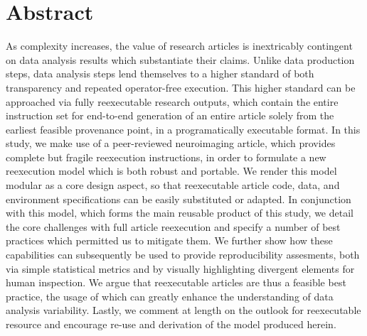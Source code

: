 \section{Abstract}

As complexity increases, the value of research articles is inextricably contingent on data analysis results which substantiate their claims.
Unlike data production steps, data analysis steps lend themselves to a higher standard of both transparency and repeated operator-free execution.
This higher standard can be approached via fully reexecutable research outputs, which contain the entire instruction set for end-to-end generation of an entire article solely from the earliest feasible provenance point, in a programatically executable format.
In this study, we make use of a peer-reviewed neuroimaging article, which provides complete but fragile reexecution instructions, in order to formulate a new reexecution model which is both robust and portable.
We render this model modular as a core design aspect, so that reexecutable article code, data, and environment specifications can be easily substituted or adapted.
In conjunction with this model, which forms the main reusable product of this study, we detail the core challenges with full article reexecution and specify a number of best practices which permitted us to mitigate them.
We further show how these capabilities can subsequently be used to provide reproducibility assesments, both via simple statistical metrics and by visually highlighting divergent elements for human inspection.
We argue that reexecutable articles are thus a feasible best practice, the usage of which can greatly enhance the understanding of data analysis variability.
Lastly, we comment at length on the outlook for reexecutable resource and encourage re-use and derivation of the model produced herein.


